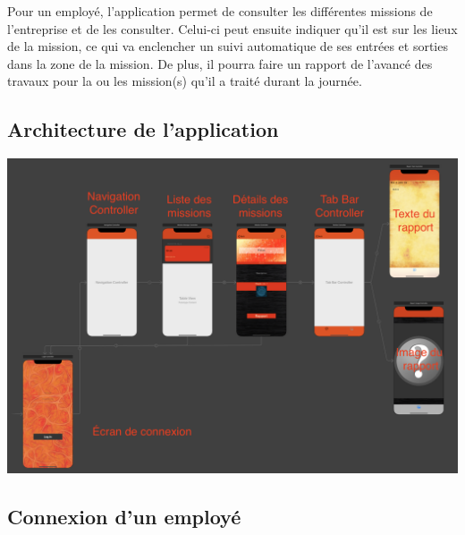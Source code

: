 \documentclass{article}
\begin{document}
Pour un employé, l'application permet de consulter les différentes missions de l'entreprise et de les consulter. Celui-ci peut ensuite indiquer qu'il est sur les lieux de la mission, ce qui va enclencher un suivi automatique de ses entrées et sorties dans la zone de la mission. De plus, il pourra faire un rapport de l'avancé des travaux pour la ou les mission(s) qu'il a traité durant la journée.

\subsection{Architecture de l'application}

\begin{center}
  \centerline{\includegraphics[scale=0.4]{archiIOS.png}}
\end{center}

\newpage

\subsection{Connexion d'un employé}
\end{document}
